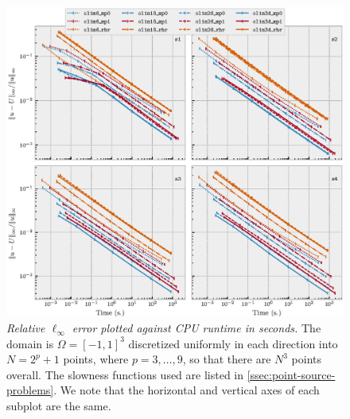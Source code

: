 \documentclass{article}
\begin{document}
\begin{figure}
  \centering \includegraphics[width=\linewidth]{time_vs_error_3d.eps}
  \caption{\emph{Relative $\ell_\infty$ error plotted against CPU
      runtime in seconds.} The domain is $\Omega = [-1, 1]^3$
    discretized uniformly in each direction into $N = 2^p + 1$ points,
    where $p = 3, \hdots, 9$, so that there are $N^3$ points
    overall. The slowness functions used are listed in
    \cref{ssec:point-source-problems}. We note that the horizontal and
    vertical axes of each subplot are the
    same.}\label{fig:time-vs-error}
\end{figure}
\end{document}
